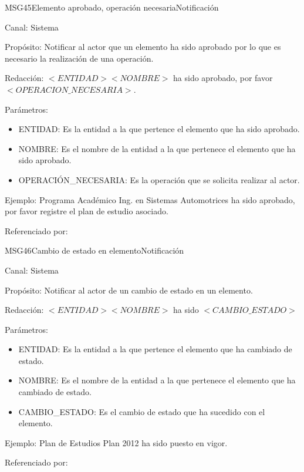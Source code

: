 \begin{mensaje}{MSG45}{Elemento aprobado, operación necesaria}{Notificación}
	\item[Canal:] Sistema
	\item[Propósito:] Notificar al actor que un elemento ha sido aprobado por lo que es necesario la realización de una operación.
	\item[Redacción:] $<ENTIDAD> <NOMBRE>$ ha sido aprobado, por favor $<OPERACION\_NECESARIA>$. 
	\item[Parámetros:] 
	\begin{itemize}
		\item ENTIDAD: Es la entidad a la que pertence el elemento que ha sido aprobado.
		\item NOMBRE: Es el nombre de la entidad a la que pertenece el elemento que ha sido aprobado.
		\item OPERACIÓN\_NECESARIA: Es la operación que se solicita realizar al actor.
	\end{itemize}
	\item[Ejemplo:] Programa Académico Ing. en Sistemas Automotrices ha sido aprobado, por favor registre el plan de estudio asociado.
	\item[Referenciado por:] 
\end{mensaje}

\begin{mensaje}{MSG46}{Cambio de estado en elemento}{Notificación}
	\item[Canal:] Sistema
	\item[Propósito:] Notificar al actor de un cambio de estado en un elemento.
	\item[Redacción:] $<ENTIDAD> <NOMBRE>$ ha sido $<CAMBIO\_ESTADO>$
	\item[Parámetros:] 
	\begin{itemize}
		\item ENTIDAD: Es la entidad a la que pertence el elemento que ha cambiado de estado.
		\item NOMBRE: Es el nombre de la entidad a la que pertenece el elemento que ha cambiado de estado.
		\item CAMBIO\_ESTADO: Es el cambio de estado que ha sucedido con el elemento. 
	\end{itemize}
	\item[Ejemplo:] Plan de Estudios Plan 2012 ha sido puesto en vigor.
	\item[Referenciado por:] 
\end{mensaje}

